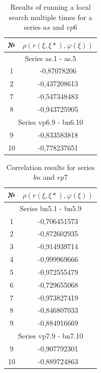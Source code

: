 \documentclass{ifacconf}
\begin{document}
\begin{table}[h!]
	\centering
	\begin{tabular}{|c|c|}
		\hline
		\hspace*{2mm} № \hspace*{2mm} & \hspace*{1cm} $\rho(r(\xi, \xi*),\varphi(\xi))$\hspace*{1cm}\\
		\hline
		\multicolumn{2}{|c|}{Series as.1 - as.5}\\
		\hline
		1  & -0,87078206\\
		2  & -0,437208613\\
		7  & -0,547348483\\
		8  & -0,943725905\\
		\hline
		\multicolumn{2}{|c|}{Series vp6.9 - bn6.10}\\
		\hline
		9  & -0,833583818\\
		10 & -0,778237651\\
		\hline	
	\end{tabular}
	\vspace{1em}
	\caption{Results of running a local search multiple times for a series $as$ and $vp6$}	\label{res_korr_as_vp}
\end{table}

\begin{table}[h!]
	\centering
	\begin{tabular}{|c|c|}
		\hline
		\hspace*{2mm} № \hspace*{2mm} & \hspace*{1cm} $\rho(r(\xi, \xi*),\varphi(\xi))$\hspace*{1cm}\\
		\hline
		\multicolumn{2}{|c|}{Series bn5.1 - bn5.9}\\
		\hline
		1  & -0,706451573\\
		2  & -0,872602935\\
		3  & -0,914939714\\
		4  & -0,999969666\\
		5  & -0,972555479\\
		6  & -0,729655068\\
		7  & -0,973827419\\
		8  & -0,846807033\\
		9  & -0,884916669\\
		\hline
		\multicolumn{2}{|c|}{Series vp7.9 - bn7.10}\\
		\hline
		9  & -0,907792301\\
		10 & -0,889724863\\		
		\hline		
	\end{tabular}
	\vspace{1em}
	\caption{Correlation results for series $bn$ and $vp7$}	\label{res_korr_bn_vp}
\end{table}
\end{document}
